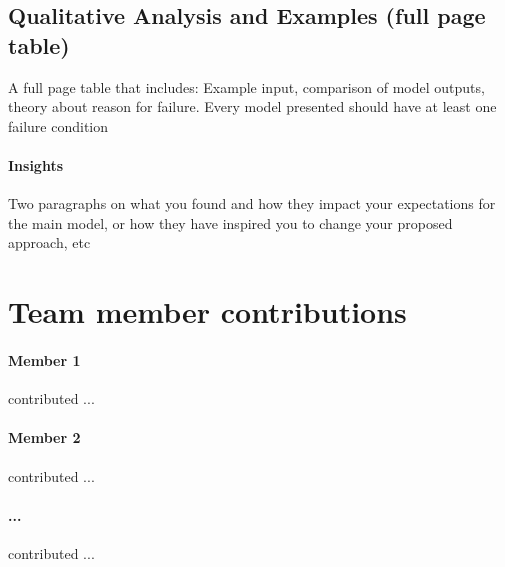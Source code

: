 \documentclass[11pt,a4paper]{article}
\begin{document}
\clearpage
\subsection{Qualitative Analysis and Examples (full page table)}
A full page table that includes: Example input, comparison of model outputs, theory about reason for failure. Every model presented should have at least one failure condition

\paragraph{Insights}
Two paragraphs on what you found and how they impact your expectations for the main model, or how they have inspired you to change your proposed approach, etc

\clearpage
\section{Team member contributions}
\paragraph{Member 1} contributed ...

\paragraph{Member 2} contributed ...

\paragraph{...} contributed ...





\end{document}
